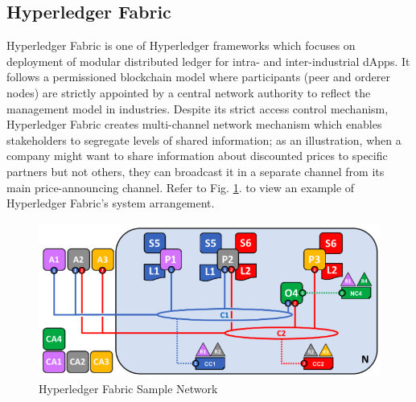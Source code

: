 \documentclass[a4paper,12pt,oneside, utf8x]{report}
\begin{document}
\subsection{Hyperledger Fabric \cite{a25,a26}}
Hyperledger Fabric is one of Hyperledger frameworks which focuses on deployment of modular distributed ledger for intra- and inter-industrial dApps. It follows a permissioned blockchain model where participants (peer and orderer nodes) are strictly appointed by a central network authority to reflect the management model in industries. Despite its strict access control mechanism, Hyperledger Fabric creates multi-channel network mechanism which enables stakeholders to segregate levels of shared information; as an illustration, when a company might want to share information about discounted prices to specific partners but not others, they can broadcast it in a separate channel from its main price-announcing channel. Refer to Fig. \ref{f32}. to view an example of Hyperledger Fabric’s system arrangement.

    \begin{figure}[H]
        \centering
        \includegraphics[width=.96\textwidth]{figures/3-2.png}
        \caption{Hyperledger Fabric Sample Network \cite{a26}}
        \label{f32}
    \end{figure}
    
\end{document}
